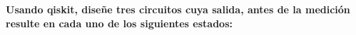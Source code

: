 \textbf{Usando qiskit, diseñe tres circuitos cuya salida, antes de la medición resulte en cada uno
de los siguientes estados:}\vspace{.2cm}
